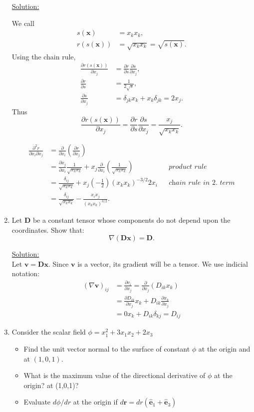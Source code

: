 \documentclass{article}
\newcommand{\ee}{\end{equation}}
\newcommand{\be}{\begin{equation}}
\newcommand{\bi}{\begin{itemize}}
\newcommand{\ei}{\end{itemize}}
\newcommand{\pa}{\partial}
\newcommand{\bs}{\boldsymbol}
\begin{document}
\begin{enumerate}
\underline{Solution:}

We call
\begin{align}
s(\bs x) &= x_k x_k, \\
r(s(\bs x)) &= \sqrt{x_k x_k} = \sqrt{s(\bs x)}.
\end{align}
Using the chain rule,
\begin{align}
\frac{\pa r(s(\bs x))}{\pa x_j} &= \frac{\pa r}{\pa s} \frac{\pa s}{\pa x_j}, \\
\frac{\pa r}{\pa s} &= \frac{1}{2\sqrt{s}}, \\
\frac{\pa s}{\pa x_j} &= \delta_{jk} x_k + x_k \delta_{jk} = 2x_j.
\end{align}
Thus
\be
\frac{\pa r(s(\bs x))}{\pa x_j} = \frac{\pa r}{\pa s} \frac{\pa s}{\pa x_j} = \frac{x_j}{\sqrt{x_k x_k}}.
\ee

\begin{align}
\frac{\pa^2 r}{\pa x_i \pa x_j} &= \frac{\pa }{\pa x_i}\left(\frac{\pa r}{\pa x_j}\right) && \\
&= \frac{\pa x_j}{\pa x_i} \frac{1}{\sqrt{x_k x_k}} + x_j \frac{\pa}{\pa x_i} \left(\frac{1}{\sqrt{x_k x_k}}\right) &&\textit{product rule} \\
&= \frac{\delta_{ij}}{\sqrt{x_k x_k}} + x_j \left(-\frac{1}{2}\right) \left(x_k x_k\right)^{-3/2} 2x_i &&\textit{chain rule in 2. term} \\
&= \frac{\delta_{ij}}{\sqrt{x_k x_k}} - \frac{x_i x_j}{\left(x_k x_k\right)^{3/2}}.
\end{align}

\item  Let $\bs{D}$ be a constant tensor whose components do not depend upon
the coordinates. Show that:
\be
\nabla (\bs{D} \bs{x})=\bs{D}.
\ee

\underline{Solution:} \\
Let  $\bs{v}=\bs{D} \bs{x}$. Since $\bs{v}$ is a vector, its gradient will be a tensor. We use indicial notation:
\be
\begin{array}{ll}
(\nabla \bs{v})_{ij}& =\frac{\pa v_i}{\pa x_j}=\frac{\pa  }{\pa x_j}(D_{ik}x_k) \\
& = \frac{\pa D_{ik}}{\pa x_j} x_k +D_{ik} \frac{\pa  x_k}{\pa x_j} \\
& = 0 x_k +D_{ik} \delta_{kj}=D_{ij}
\end{array}
\ee

\item  Consider the scalar field $\phi=x_1^2+3x_1x_2+2x_3$
\bi
\item  Find the unit vector normal to the surface of constant $\phi$ at the origin and at $(1,0,1)$. 
\item What is the maximum value of the directional derivative of $\phi$ at the origin? at (1,0,1)? 
\item  Evaluate $d\phi/d r$ at the origin if $d\bs{r}=dr(\bs{\hat{e}}_1+\bs{\hat{e}}_3)$
\ei


\end{enumerate}
\end{document}
